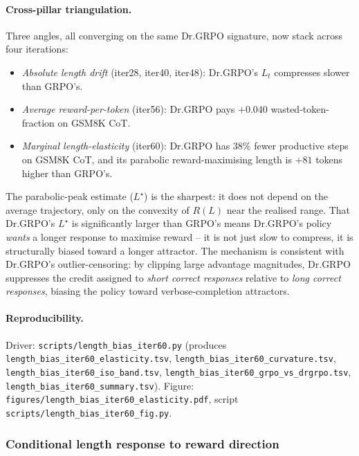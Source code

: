 \documentclass{article}
\begin{document}
\paragraph{Cross-pillar triangulation.}
Three angles, all converging on the same Dr.GRPO signature, now stack
across four iterations:
\begin{itemize}
\item \emph{Absolute length drift} (iter28, iter40, iter48):
      Dr.GRPO's $L_t$ compresses slower than GRPO's.
\item \emph{Average reward-per-token} (iter56): Dr.GRPO pays
      $+0.040$ wasted-token-fraction on GSM8K CoT.
\item \emph{Marginal length-elasticity} (iter60): Dr.GRPO has $38\%$
      fewer productive steps on GSM8K CoT, and its parabolic
      reward-maximising length is $+81$ tokens higher than GRPO's.
\end{itemize}
The parabolic-peak estimate ($L^\star$) is the sharpest: it does not
depend on the average trajectory, only on the convexity of $R(L)$
near the realised range. That Dr.GRPO's $L^\star$ is significantly
larger than GRPO's means Dr.GRPO's policy \emph{wants} a longer
response to maximise reward -- it is not just slow to compress, it
is structurally biased toward a longer attractor. The mechanism is
consistent with Dr.GRPO's outlier-censoring: by clipping large
advantage magnitudes, Dr.GRPO suppresses the credit assigned to
\textit{short correct responses} relative to \textit{long correct
responses}, biasing the policy toward verbose-completion attractors.

\paragraph{Reproducibility.}
Driver: \texttt{scripts/length\_bias\_iter60.py} (produces
\texttt{length\_bias\_iter60\_elasticity.tsv},
\texttt{length\_bias\_iter60\_curvature.tsv},
\texttt{length\_bias\_iter60\_iso\_band.tsv},
\texttt{length\_bias\_iter60\_grpo\_vs\_drgrpo.tsv},
\texttt{length\_bias\_iter60\_summary.tsv}).
Figure: \texttt{figures/length\_bias\_iter60\_elasticity.pdf},
script \texttt{scripts/length\_bias\_iter60\_fig.py}. 

\subsubsection{Conditional length response to reward direction}\label{sec:lb-iter64}
\end{document}
